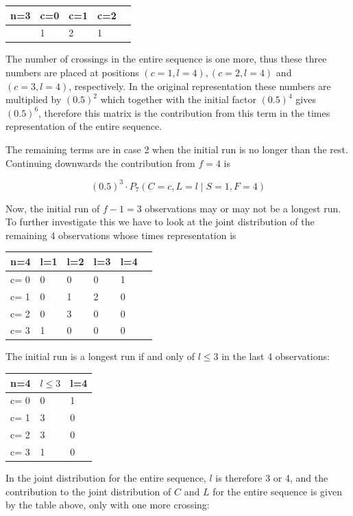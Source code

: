 \begin{tabular}{l | l l l l}
\hline
n=3&c=0&c=1&c=2\\
\hline
& 1& 2& 1\\
\hline
\end{tabular}


The number of crossings in the entire sequence is one more, thus these three numbers are placed at positions $(c=1,l=4), (c=2,l=4)$ and $(c=3,l=4)$, respectively. In the original representation these numbers are multiplied by $(0.5)^2$ which together with the initial factor $(0.5)^4$ gives $(0.5)^6$, therefore this matrix is the contribution from this term in the times representation of the entire sequence.

The remaining terms are in case 2 when the initial run is no longer than the rest. Continuing downwards the contribution from $f=4$ is 

$$(0.5)^3 \cdot   P_7 (C=c, L=l \mid S=1,F=4)$$

Now, the initial run of $f-1=3$ observations may or may not be a longest run. To further investigate this we have to look at the joint distribution of the remaining 4 observations whose times representation is 

\begin{tabular}{l | l l l l l}
\hline
n=4&l=1&l=2&l=3&l=4\\
\hline
c= 0& 0& 0& 0& 1\\
c= 1& 0& 1& 2& 0\\
c= 2& 0& 3& 0& 0\\
c= 3& 1& 0& 0& 0\\
\hline
\end{tabular}

The initial run is a longest run if and only of $l \leq 3$ in the last 4 observations:

\begin{tabular}{l | l l}
\hline
n=4&$l \leq 3$&l=4\\
\hline
c= 0& 0& 1\\
c= 1& 3& 0\\
c= 2& 3& 0\\
c= 3& 1& 0\\
\hline
\end{tabular}

In the joint distribution for the entire sequence, $l$ is therefore 3 or 4, and the contribution to the joint distribution of $C$ and $L$ for the entire sequence is given by the table above, only with one more crossing:


